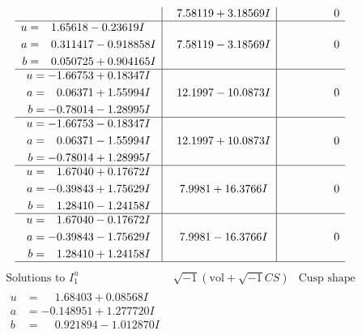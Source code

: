 \documentclass[1p]{elsarticle_modified}
\theoremstyle{definition}
\newcommand{\I}{\sqrt{-1}}
\begin{document}
$$\begin{array}{c|c|c}
 & \phantom{-}7.58119 + 3.18569 I & \phantom{-0.000000 } 0 \\ \hline\begin{aligned}
u &= \phantom{-}1.65618 - 0.23619 I \\
a &= \phantom{-}0.311417 - 0.918858 I \\
b &= \phantom{-}0.050725 + 0.904165 I\end{aligned}
 & \phantom{-}7.58119 - 3.18569 I & \phantom{-0.000000 } 0 \\ \hline\begin{aligned}
u &= -1.66753 + 0.18347 I \\
a &= \phantom{-}0.06371 + 1.55994 I \\
b &= -0.78014 - 1.28995 I\end{aligned}
 & \phantom{-}12.1997 - 10.0873 I & \phantom{-0.000000 } 0 \\ \hline\begin{aligned}
u &= -1.66753 - 0.18347 I \\
a &= \phantom{-}0.06371 - 1.55994 I \\
b &= -0.78014 + 1.28995 I\end{aligned}
 & \phantom{-}12.1997 + 10.0873 I & \phantom{-0.000000 } 0 \\ \hline\begin{aligned}
u &= \phantom{-}1.67040 + 0.17672 I \\
a &= -0.39843 + 1.75629 I \\
b &= \phantom{-}1.28410 - 1.24158 I\end{aligned}
 & \phantom{-}7.9981 + 16.3766 I & \phantom{-0.000000 } 0 \\ \hline\begin{aligned}
u &= \phantom{-}1.67040 - 0.17672 I \\
a &= -0.39843 - 1.75629 I \\
b &= \phantom{-}1.28410 + 1.24158 I\end{aligned}
 & \phantom{-}7.9981 - 16.3766 I & \phantom{-0.000000 } 0\\
 \hline 
 \end{array}$$\newpage$$\begin{array}{c|c|c}  
\text{Solutions to }I^u_{1}& \I (\text{vol} + \sqrt{-1}CS) & \text{Cusp shape}\\
 \hline 
\begin{aligned}
u &= \phantom{-}1.68403 + 0.08568 I \\
a &= -0.148951 + 1.277720 I \\
b &= \phantom{-}0.921894 - 1.012870 I\end{aligned}

\end{array}$$
\end{document}

